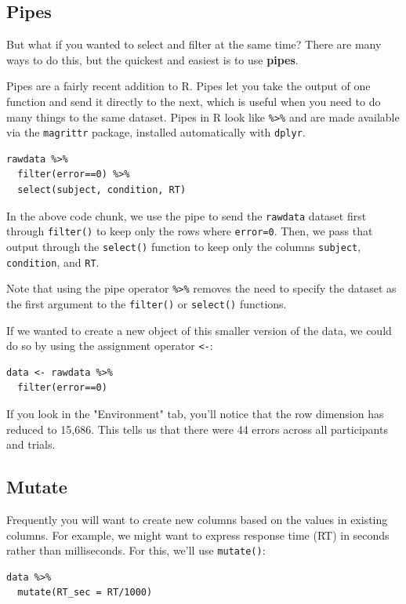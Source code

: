 \documentclass[11pt]{article}
\begin{document}
\subsection*{Pipes}
\label{sec-3-2}
But what if you wanted to select and filter at the same time?  There are many ways to do this, but the quickest and easiest is to use \textbf{pipes}.

Pipes are a fairly recent addition to R. Pipes let you take the output of one function and send it directly to the next, which is useful when you need to do many things to the same dataset. Pipes in R look like \texttt{\%>\%} and are made available via the \texttt{magrittr} package, installed automatically with \texttt{dplyr}. 

\begin{verbatim}
rawdata %>%
  filter(error==0) %>%
  select(subject, condition, RT)
\end{verbatim}

In the above code chunk, we use the pipe to send the \texttt{rawdata} dataset first through \texttt{filter()} to keep only the rows where \texttt{error=0}.  Then, we pass that output through the \texttt{select()} function to keep only the columns \texttt{subject}, \texttt{condition}, and \texttt{RT}.

Note that using the pipe operator \texttt{\%>\%} removes the need to specify the dataset as the first argument to the \texttt{filter()} or \texttt{select()} functions.

If we wanted to create a new object of this smaller version of the data, we could do so by using the assignment operator \texttt{<-}:

\begin{verbatim}
data <- rawdata %>%
  filter(error==0)
\end{verbatim}

If you look in the "Environment" tab, you'll notice that the row dimension has reduced to 15,686.  This tells us that there were 44 errors across all participants and trials.


\subsection*{Mutate}
\label{sec-3-3}
Frequently you will want to create new columns based on the values in existing columns.  For example, we might want to express response time (RT) in seconds rather than milliseconds.  For this, we'll use \texttt{mutate()}:

\begin{verbatim}
data %>%
  mutate(RT_sec = RT/1000)
\end{verbatim}
\end{document}
